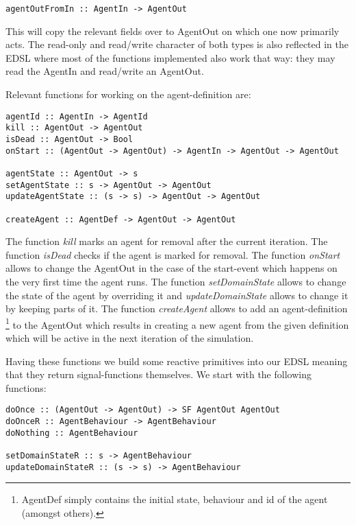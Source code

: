 \begin{verbatim}
agentOutFromIn :: AgentIn -> AgentOut
\end{verbatim}

This will copy the relevant fields over to AgentOut on which one now primarily acts. The read-only and read/write character of both types is also reflected in the EDSL where most of the functions implemented also work that way: they may read the AgentIn and read/write an AgentOut.

Relevant functions for working on the agent-definition are:

\begin{verbatim}
agentId :: AgentIn -> AgentId
kill :: AgentOut -> AgentOut
isDead :: AgentOut -> Bool
onStart :: (AgentOut -> AgentOut) -> AgentIn -> AgentOut -> AgentOut

agentState :: AgentOut -> s
setAgentState :: s -> AgentOut -> AgentOut
updateAgentState :: (s -> s) -> AgentOut -> AgentOut

createAgent :: AgentDef -> AgentOut -> AgentOut
\end{verbatim}

The function \textit{kill} marks an agent for removal after the current iteration. The function \textit{isDead} checks if the agent is marked for removal. The function \textit{onStart} allows to change the AgentOut in the case of the start-event which happens on the very first time the agent runs.
The function \textit{setDomainState} allows to change the state of the agent by overriding it and \textit{updateDomainState} allows to change it by keeping parts of it.
The function \textit{createAgent} allows to add an agent-definition \footnote{AgentDef simply contains the initial state, behaviour and id of the agent (amongst others).} to the AgentOut which results in creating a new agent from the given definition which will be active in the next iteration of the simulation. 

Having these functions we build some reactive primitives into our EDSL meaning that they return signal-functions themselves. We start with the following functions:

\begin{verbatim}
doOnce :: (AgentOut -> AgentOut) -> SF AgentOut AgentOut
doOnceR :: AgentBehaviour -> AgentBehaviour
doNothing :: AgentBehaviour

setDomainStateR :: s -> AgentBehaviour
updateDomainStateR :: (s -> s) -> AgentBehaviour
\end{verbatim}

